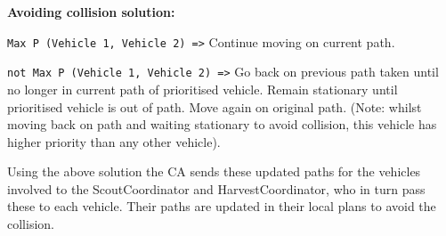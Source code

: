 \textbf{Avoiding collision solution:}


\texttt{Max P (Vehicle 1, Vehicle 2) =>} Continue moving on current path.

\texttt{not Max P (Vehicle 1, Vehicle 2) =>} Go back on previous path taken until no longer in current path of prioritised vehicle. Remain stationary until prioritised vehicle is out of path. Move again on original path. (Note: whilst moving back on path and waiting stationary to avoid collision, this vehicle has higher priority than any other vehicle).

Using the above solution the CA sends these updated paths for the vehicles involved to the ScoutCoordinator and HarvestCoordinator, who in turn pass these to each vehicle. Their paths are updated in their local plans to avoid the collision.  







